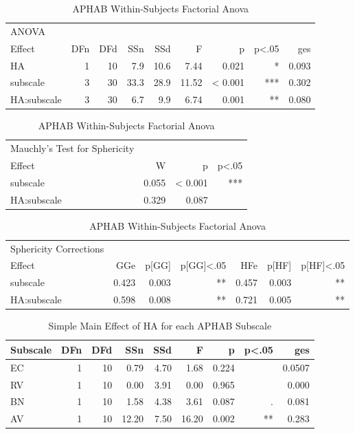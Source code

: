 \clearpage

\begin{table}[htp]
\begin{tabular}{lrrrrrrrr}
  \hline
  ANOVA & & & & & & & & \\
  Effect & DFn & DFd & SSn & SSd & F & p & p<.05 & ges \\
         HA  & 1 & 10 &   7.9 & 10.6 &  7.44  & 0.021  &   * & 0.093 \\
   subscale  & 3 & 30 &  33.3 & 28.9 & 11.52 & < 0.001 &     *** & 0.302 \\
HA:subscale  & 3 & 30 &   6.7 & 9.9 &  6.74 & 0.001  &   ** & 0.080 \\
   \hline
\end{tabular}
\begin{tabular}{lrrr}
  Mauchly's Test for Sphericity & & & \\
  Effect &     W   &     p & p<.05 \\
   subscale & 0.055 & < 0.001 &    *** \\
HA:subscale & 0.329 & 0.087 &      \\
  \hline
\end{tabular}
\begin{tabular}{lrrrrrr}
  Sphericity Corrections & & & & & & \\
   Effect &  GGe &  p[GG] & p[GG]<.05 &  HFe &  p[HF] & p[HF]<.05 \\
   subscale & 0.423 & 0.003 &        ** & 0.457 & 0.003 &        ** \\
HA:subscale & 0.598 & 0.008 &        ** & 0.721 & 0.005 &        ** \\
   \hline
\end{tabular}
\caption{APHAB Within-Subjects Factorial Anova}
\end{table}

\begin{table}[htp]
\begin{center}
\begin{tabular}{lrrrrrrrr}
Subscale & DFn & DFd & SSn & SSd & F & p & p<.05 & ges \\
\hline
EC &  1 & 10 &  0.79 & 4.70 &  1.68 & 0.224  & &    0.0507 \\
RV &  1 & 10 & 0.00 & 3.91 & 0.00 & 0.965 & & 0.000 \\
BN &  1 & 10 &  1.58 & 4.38 &  3.61 & 0.087 &    . & 0.081 \\
AV &  1 & 10 & 12.20 & 7.50 & 16.20 & 0.002 &    ** & 0.283 \\
\hline
\end{tabular}
\end{center}
\caption{Simple Main Effect of HA for each APHAB Subscale}
\end{table}

